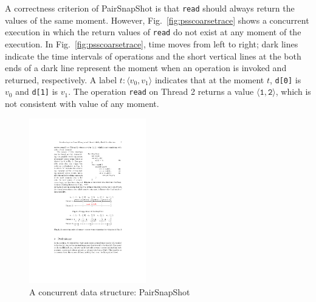 \documentclass[runningheads]{llncs}
\newcommand{\pair}[1]{{\langle{#1}\rangle}}
\begin{document}
 A correctness criterion of PairSnapShot is that \texttt{read} should always return the values of the same moment. However, 
Fig.~\ref{fig:psscoarsetrace} shows a concurrent execution in which the return values of \texttt{read} do not exist at any moment of the execution. 
In Fig.~\ref{fig:psscoarsetrace}, time moves from left to right; dark lines indicate the time intervals of operations and  
the short vertical lines at the both ends of a dark line represent the moment when an operation is invoked and returned, respectively.
A label ${t:\langle v_0,v_1\rangle}$ indicates that at the moment $t$,  \texttt{d[0]} is $v_0$ and \texttt{d[1]} is $v_1$.
  The operation \texttt{read} on Thread 2 returns a value $\mathtt{\pair{1,2}}$,
  which is not consistent with value of any moment. 
  
    \begin{figure}
\centering
\vspace{-0.7cm}
   \includegraphics[width = 2in]{pss.pdf}
        \caption{A concurrent data structure: PairSnapShot}
        \label{fig:pairsnapshot}
\end{figure}
\end{document}
